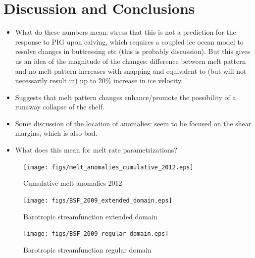 \documentclass[draft]{agujournal2019}
\begin{document}


\section{Discussion and Conclusions}
\begin{itemize}
    \item What do these numbers mean: stress that this is not a prediction for the response to PIG upon calving, which requires a coupled ice ocean model to resolve changes in buttressing etc (this is probably discussion). But this gives us an idea of the magnitude of the changes: difference between melt pattern and no melt pattern increases with snapping and equivalent to (but will not necessarily result in) up to 20\% increase in ice velocity. 
    \item Suggests that melt pattern changes enhance/promote the possibility of a runaway collapse of the shelf.
    \item Some discussion of the location of anomalies: seem to be focused on the shear margins, which is also bad.
    \item What does this mean for melt rate parametrizations?
\end{itemize}

\begin{figure}
    \centering
    \texttt{[image: figs/melt\_anomalies\_cumulative\_2012.eps]}
    \caption{Cumulative melt anomalies 2012 }
    \label{fig:melt_anomalies_2012_cumulative}
\end{figure}

\begin{figure}
    \centering
    \texttt{[image: figs/BSF\_2009\_extended\_domain.eps]}
    \caption{Barotropic streamfunction extended domain }
    \label{fig:barotropic_streamfunction_extended_domain}
\end{figure}

\begin{figure}
    \centering
    \texttt{[image: figs/BSF\_2009\_regular\_domain.eps]}
    \caption{Barotropic streamfunction regular domain }
    \label{fig:barotropic_streamfunction_regular_domain}
\end{figure}
\end{document}
